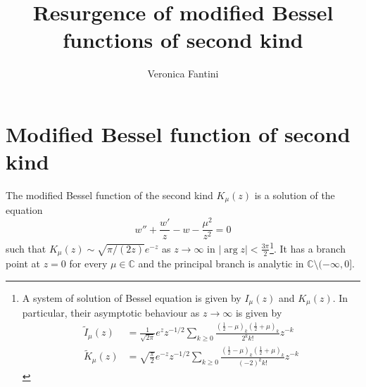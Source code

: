 \documentclass{article}
\title{Resurgence of modified Bessel functions of second kind}
\author{Veronica Fantini}
\newcommand{\C}{\mathbb{C}}
\begin{document}
\maketitle

\section{Modified Bessel function of second kind}

The modified Bessel function of the second kind $K_\mu(z)$ is a solution of the equation
\begin{equation}\label{Bessel_nu}
w''+\frac{w'}{z}-w-\frac{\mu^2}{z^2}=0
\end{equation}
such that $K_{\mu}(z)\sim\sqrt{\pi/(2z)}e^{-z}$ as $z\to\infty$ in $|\arg z|<\frac{3\pi}{2}$\footnote{A system of solution of Bessel equation is given by $I_\mu(z)$ and $K_\mu(z)$. In particular, their asymptotic behaviour as $z\to\infty$ is given by \begin{align}
\tilde{I}_\mu(z)&=\frac{1}{\sqrt{2\pi}}e^zz^{-1/2}\sum_{k\geq 0}\frac{\left(\frac{1}{2}-\mu\right)_k\left(\frac{1}{2}+\mu\right)_k}{2^kk!}z^{-k}\\
\tilde{K}_{\mu}(z)&=\sqrt{\frac{\pi}{2}}e^{-z}z^{-1/2}\sum_{k\geq 0}\frac{\left(\frac{1}{2}-\mu\right)_k\left(\frac{1}{2}+\mu\right)_k}{(-2)^kk!}z^{-k}
\end{align}}. It has a branch point at $z=0$ for every $\mu\in\C$ and  the principal branch is analytic in $\C\setminus(-\infty,0]$. 
\end{document}
